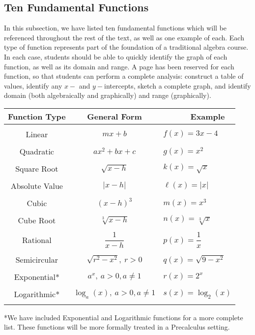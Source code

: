 \documentclass[11pt]{book}
\newcommand{\tmstrong}[1]{\textbf{#1}}
\theoremstyle{definition}  %
\newcommand{\pp}{\par~\par}
\begin{document}
\subsection{Ten Fundamental Functions}

In this subsection, we have listed ten fundamental functions which will be referenced throughout the rest of the text, as well as one example of each.  Each type of function represents part of the foundation of a traditional algebra course.  In each case, students should be able to quickly identify the graph of each function, as well as its domain and range.  A page has been reserved for each function, so that students can perform a complete analysis: construct a table of values, identify any $x-$ and $y-$intercepts, sketch a complete graph, and identify domain (both algebraically and graphically) and range (graphically).
\begin{center}
\begin{tabular}{|c|c|l|}
\hline
Function Type & General Form & ~~~~~~Example\\
\hline
&&\\
Linear & $mx+b$ & $f(x)=3x-4$\\
&&\\
Quadratic & $ax^2+bx+c$ & $g(x)=x^2$\\
&&\\
Square Root & $\sqrt{x-h}$ & $k(x)=\sqrt{x}$\\
&&\\
Absolute Value & $|x-h|$ & $\ell(x)=|x|$\\
&&\\
Cubic & $(x-h)^3$ & $m(x)=x^3$\\
&&\\
Cube Root & $\sqrt[3]{x-h}$ & $n(x)=\sqrt[3]{x}$\\
&&\\
Rational & $\dfrac{1}{x-h}$ & $p(x)=\dfrac{1}{x}$\\
&&\\
Semicircular & $\sqrt{r^2-x^2},~r>0$ & $q(x)=\sqrt{9-x^2}$\\
&&\\
Exponential* & $a^x,~a>0, a\neq 1$ & $r(x)=2^x$\\
&&\\
Logarithmic* & $\log_a(x),~a>0, a\neq1$ & $s(x)=\log_2(x)$\\
&&\\
\hline
\end{tabular}
\end{center}
*We have included Exponential and Logarithmic functions for a more complete list.  These functions will be more formally treated in a Precalculus setting. 
\end{document}
